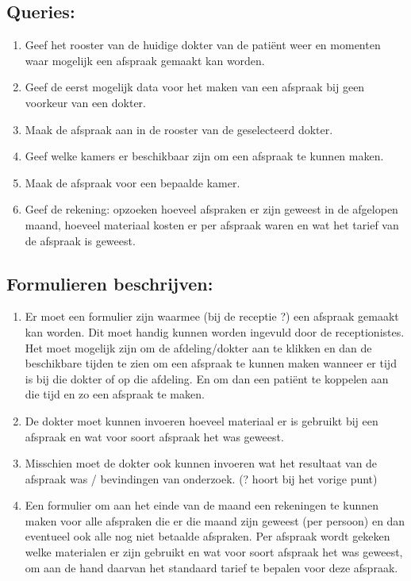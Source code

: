 \subsection*{Queries:}
\begin{enumerate}

\item Geef het rooster van de huidige dokter van de pati\"ent weer en
momenten waar mogelijk een afspraak gemaakt kan worden.
\item Geef de eerst mogelijk data voor het maken van een afspraak
bij geen voorkeur van een dokter.
\item Maak de afspraak aan in de rooster van de geselecteerd dokter.

\item Geef welke kamers er beschikbaar zijn om een afspraak te kunnen
maken.
\item Maak de afspraak voor een bepaalde kamer.
\item Geef de rekening: opzoeken hoeveel afspraken er zijn geweest in de afgelopen maand, hoeveel materiaal kosten er per afspraak waren en wat het tarief van de afspraak is geweest.
\end{enumerate}

\subsection*{Formulieren beschrijven:}
\begin{enumerate}
\item Er moet een formulier zijn waarmee (bij de receptie ?) een afspraak
   gemaakt kan worden. Dit moet handig kunnen worden ingevuld door de
   receptionistes. Het moet mogelijk zijn om de afdeling/dokter aan te klikken
   en dan de beschikbare tijden te zien om een afspraak te kunnen maken wanneer
   er tijd is bij die dokter of op die afdeling. En om dan een pati\"ent te
   koppelen aan die tijd en zo een afspraak te maken.
\item De dokter moet kunnen invoeren hoeveel materiaal er is gebruikt bij een
   afspraak en wat voor soort afspraak het was geweest.
\item Misschien moet de dokter ook kunnen invoeren wat het resultaat van de afspraak
   was / bevindingen van onderzoek. (? hoort bij het vorige punt) 
\item Een formulier om aan het einde van de maand een rekeningen te kunnen maken
   voor alle afspraken die er die maand zijn geweest (per persoon) en dan
   eventueel ook alle nog niet betaalde afspraken. Per afspraak wordt gekeken
   welke materialen er zijn gebruikt en wat voor soort afspraak het was geweest,
   om aan de hand daarvan het standaard tarief te bepalen voor deze afspraak.
\end{enumerate}
